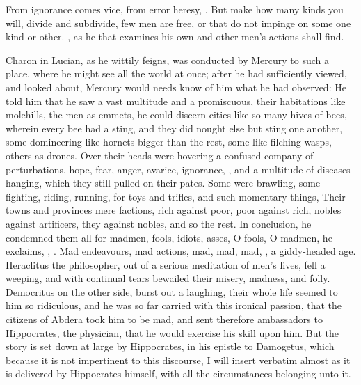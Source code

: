 {From ignorance comes vice, from error heresy, \etc. But make how many
kinds you will, divide and subdivide, few men are free, or that do not
impinge on some one kind or other. , as he that examines his own and other men's actions shall
find.

Charon in Lucian, as he wittily feigns, was conducted by Mercury
to such a place, where he might see all the world at once; after he had
sufficiently viewed, and looked about, Mercury would needs know of him
what he had observed: He told him that he saw a vast multitude and a
promiscuous, their habitations like molehills, the men as emmets, he
could discern cities like so many hives of bees, wherein every bee had
a sting, and they did nought else but sting one another, some
domineering like hornets bigger than the rest, some like filching
wasps, others as drones. Over their heads were hovering a confused
company of perturbations, hope, fear, anger, avarice, ignorance, \etc{},
and a multitude of diseases hanging, which they still pulled on their
pates. Some were brawling, some fighting, riding, running,  for toys and trifles, and such momentary
things, Their towns and provinces mere factions, rich against poor,
poor against rich, nobles against artificers, they against nobles, and
so the rest. In conclusion, he condemned them all for madmen, fools,
idiots, asses,  O fools, O madmen,
he exclaims, , \etc{}. Mad endeavours, mad
actions, mad, mad, mad, , a
giddy-headed age. Heraclitus the philosopher, out of a serious
meditation of men's lives, fell a weeping, and with continual tears
bewailed their misery, madness, and folly. Democritus on the other
side, burst out a laughing, their whole life seemed to him so
ridiculous, and he was so far carried with this ironical passion, that
the citizens of Abdera took him to be mad, and sent therefore
ambassadors to Hippocrates, the physician, that he would exercise his
skill upon him. But the story is set down at large by Hippocrates, in
his epistle to Damogetus, which because it is not impertinent to this
discourse, I will insert verbatim almost as it is delivered by
Hippocrates himself, with all the circumstances belonging unto it.

}
